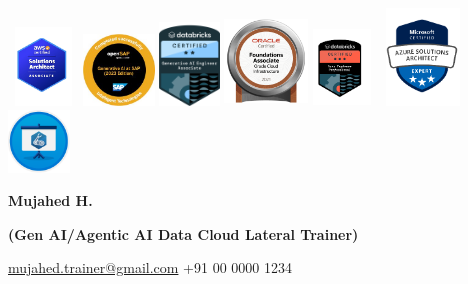 \documentclass[a4paper]{article}
\begin{document}
\includegraphics[width=0.73668in,height=0.81548in]{media/image1.png}
\includegraphics[width=0.74287in,height=0.74561in]{media/image2.jpeg}
\includegraphics[width=0.62821in,height=0.87111in]{media/image3.png}
\includegraphics[width=0.87421in,height=0.92262in]{media/image4.png}
\includegraphics[width=0.60088in,height=0.8017in]{media/image5.png}
\includegraphics[width=0.99074in,height=1.01661in]{media/image6.png}
\includegraphics[width=0.65064in,height=0.65064in]{media/image7.png}

\begin{center}
  {\large \textbf{Mujahed H.}}\\[0.2cm]
\end{center}
\begin{center}
  \textbf{(Gen AI/Agentic AI Data Cloud Lateral Trainer)}
\end{center}
\begin{center}
  \href{mailto:mujahed.trainer@gmail.com}{mujahed.trainer@gmail.com} \textbar{} +91 00 0000 1234
\end{center}
\end{document}
